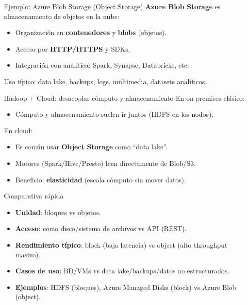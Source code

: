 \documentclass{beamer}
\begin{document}
\begin{frame}{Ejemplo: Azure Blob Storage (Object Storage)}
\textbf{Azure Blob Storage} es almacenamiento de objetos en la nube:
\begin{itemize}
    \item Organización en \textbf{contenedores} y \textbf{blobs} (objetos).
    \item Acceso por \textbf{HTTP/HTTPS} y SDKs.
    \item Integración con analítica: Spark, Synapse, Databricks, etc.
\end{itemize}

\medskip
Uso típico: data lake, backups, logs, multimedia, datasets analíticos.
\end{frame}

\begin{frame}{Hadoop + Cloud: desacoplar cómputo y almacenamiento}
En on-premises clásico:
\begin{itemize}
    \item Cómputo y almacenamiento suelen ir juntos (HDFS en los nodos).
\end{itemize}

En cloud:
\begin{itemize}
    \item Es común usar \textbf{Object Storage} como “data lake”.
    \item Motores (Spark/Hive/Presto) leen directamente de Blob/S3.
    \item Beneficio: \textbf{elasticidad} (escala cómputo sin mover datos).
\end{itemize}
\end{frame}

\begin{frame}{Comparativa rápida}
\begin{itemize}
    \item \textbf{Unidad}: bloques vs objetos.
    \item \textbf{Acceso}: como disco/sistema de archivos vs API (REST).
    \item \textbf{Rendimiento típico}: block (baja latencia) vs object (alto throughput masivo).
    \item \textbf{Casos de uso}: BD/VMs vs data lake/backups/datos no estructurados.
    \item \textbf{Ejemplos}: HDFS (bloques), Azure Managed Disks (block) vs Azure Blob (object).
\end{itemize}
\end{frame}
\end{document}
